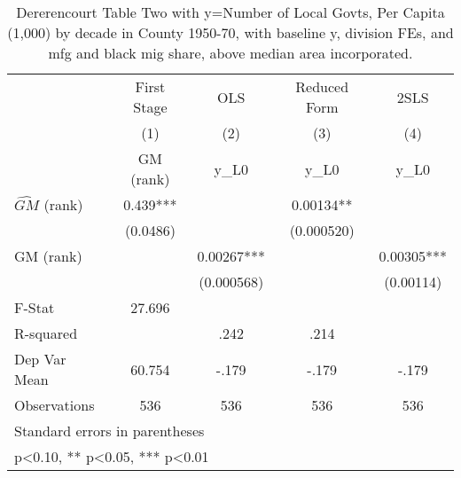 \begin{table}[htbp]\centering
\def\sym#1{\ifmmode^{#1}\else\(^{#1}\)\fi}
\caption{Dererencourt Table Two with y=Number of Local Govts, Per Capita (1,000) by decade in County 1950-70, with baseline y, division FEs, and mfg and black mig share, above median area incorporated.}
\begin{tabular}{l*{4}{c}}
\toprule
                    & First Stage   &         OLS   &Reduced Form   &        2SLS   \\
                    &\multicolumn{1}{c}{(1)}&\multicolumn{1}{c}{(2)}&\multicolumn{1}{c}{(3)}&\multicolumn{1}{c}{(4)}\\
                    &\multicolumn{1}{c}{GM  (rank)}&\multicolumn{1}{c}{y\_L0}&\multicolumn{1}{c}{y\_L0}&\multicolumn{1}{c}{y\_L0}\\
\midrule
$\hat{GM}$ (rank)   &       0.439***&               &     0.00134** &               \\
                    &    (0.0486)   &               &  (0.000520)   &               \\
\addlinespace
GM  (rank)          &               &     0.00267***&               &     0.00305***\\
                    &               &  (0.000568)   &               &   (0.00114)   \\
\midrule
F-Stat              &      27.696   &               &               &               \\
R-squared           &               &        .242   &        .214   &               \\
Dep Var Mean        &      60.754   &       -.179   &       -.179   &       -.179   \\
Observations        &         536   &         536   &         536   &         536   \\
\bottomrule
\multicolumn{5}{l}{\footnotesize Standard errors in parentheses}\\
\multicolumn{5}{l}{\footnotesize * p<0.10, ** p<0.05, *** p<0.01}\\
\end{tabular}
\end{table}
